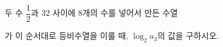 두 수 $\dfrac{1}{2}$과 $32$ 사이에 8개의 수를 넣어서 만든 수열\par\smallskip{}\par\smallskip\noindent 가 이 순서대로 등비수열을 이룰 때, $\log_2 a_3$의 값을 구하시오.
